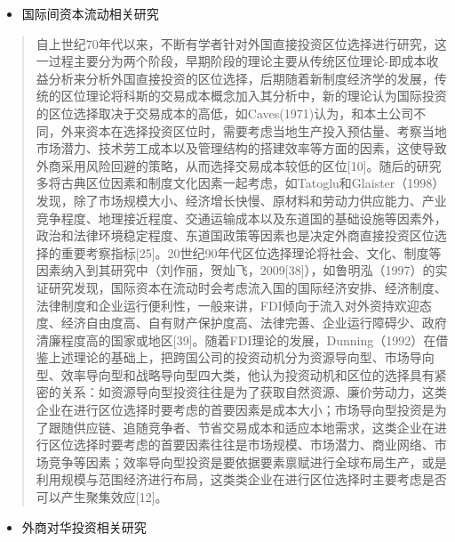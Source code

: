 \documentclass[]{article}
\providecommand{\tightlist}{%
  \setlength{\itemsep}{0pt}\setlength{\parskip}{0pt}}
\begin{document}
\begin{itemize}
\tightlist
\item
  国际间资本流动相关研究
\end{itemize}

\begin{quote}
自上世纪70年代以来，不断有学者针对外国直接投资区位选择进行研究，这一过程主要分为两个阶段，早期阶段的理论主要从传统区位理论-即成本收益分析来分析外国直接投资的区位选择，后期随着新制度经济学的发展，传统的区位理论将科斯的交易成本概念加入其分析中，新的理论认为国际投资的区位选择取决于交易成本的高低，如Caves(1971)认为，和本土公司不同，外来资本在选择投资区位时，需要考虑当地生产投入预估量、考察当地市场潜力、技术劳工成本以及管理结构的搭建效率等方面的因素，这使导致外商采用风险回避的策略，从而选择交易成本较低的区位{[}10{]}。随后的研究多将古典区位因素和制度文化因素一起考虑，如Tatoglu和Glaister（1998）发现，除了市场规模大小、经济增长快慢、原材料和劳动力供应能力、产业竞争程度、地理接近程度、交通运输成本以及东道国的基础设施等因素外，政治和法律环境稳定程度、东道国政策等因素也是决定外商直接投资区位选择的重要考察指标{[}25{]}。20世纪90年代区位选择理论将社会、文化、制度等因素纳入到其研究中（刘作丽，贺灿飞，2009{[}38{]}），如鲁明泓（1997）的实证研究发现，国际资本在流动时会考虑流入国的国际经济安排、经济制度、法律制度和企业运行便利性，一般来讲，FDI倾向于流入对外资持欢迎态度、经济自由度高、自有财产保护度高、法律完善、企业运行障碍少、政府清廉程度高的国家或地区{[}39{]}。随着FDI理论的发展，Dunning（1992）在借鉴上述理论的基础上，把跨国公司的投资动机分为资源导向型、市场导向型、效率导向型和战略导向型四大类，他认为投资动机和区位的选择具有紧密的关系：如资源导向型投资往往是为了获取自然资源、廉价劳动力，这类企业在进行区位选择时要考虑的首要因素是成本大小；市场导向型投资是为了跟随供应链、追随竞争者、节省交易成本和适应本地需求，这类企业在进行区位选择时要考虑的首要因素往往是市场规模、市场潜力、商业网络、市场竞争等因素；效率导向型投资是要依据要素禀赋进行全球布局生产，或是利用规模与范围经济进行布局，这类类企业在进行区位选择时主要考虑是否可以产生聚集效应{[}12{]}。
\end{quote}

\begin{itemize}
\tightlist
\item
  外商对华投资相关研究
\end{itemize}
\end{document}
